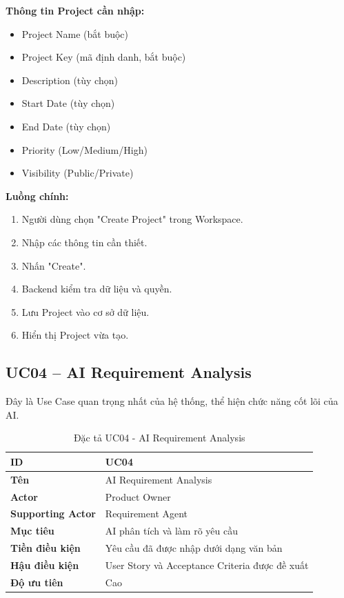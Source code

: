 \documentclass[12pt,a4paper]{report}
\begin{document}
\textbf{Thông tin Project cần nhập:}

\begin{itemize}
\item Project Name (bắt buộc)
\item Project Key (mã định danh, bắt buộc)
\item Description (tùy chọn)
\item Start Date (tùy chọn)
\item End Date (tùy chọn)
\item Priority (Low/Medium/High)
\item Visibility (Public/Private)
\end{itemize}

\textbf{Luồng chính:}

\begin{enumerate}
\item Người dùng chọn "Create Project" trong Workspace.
\item Nhập các thông tin cần thiết.
\item Nhấn "Create".
\item Backend kiểm tra dữ liệu và quyền.
\item Lưu Project vào cơ sở dữ liệu.
\item Hiển thị Project vừa tạo.
\end{enumerate}

\subsection{UC04 -- AI Requirement Analysis}

Đây là Use Case quan trọng nhất của hệ thống, thể hiện chức năng cốt lõi của AI.

\begin{table}[H]
\centering
\caption{Đặc tả UC04 - AI Requirement Analysis}
\begin{tabular}{|p{4cm}|p{11cm}|}
\hline
\textbf{ID} & UC04 \\
\hline
\textbf{Tên} & AI Requirement Analysis \\
\hline
\textbf{Actor} & Product Owner \\
\hline
\textbf{Supporting Actor} & Requirement Agent \\
\hline
\textbf{Mục tiêu} & AI phân tích và làm rõ yêu cầu \\
\hline
\textbf{Tiền điều kiện} & Yêu cầu đã được nhập dưới dạng văn bản \\
\hline
\textbf{Hậu điều kiện} & User Story và Acceptance Criteria được đề xuất \\
\hline
\textbf{Độ ưu tiên} & Cao \\
\hline
\end{tabular}
\end{table}
\end{document}
